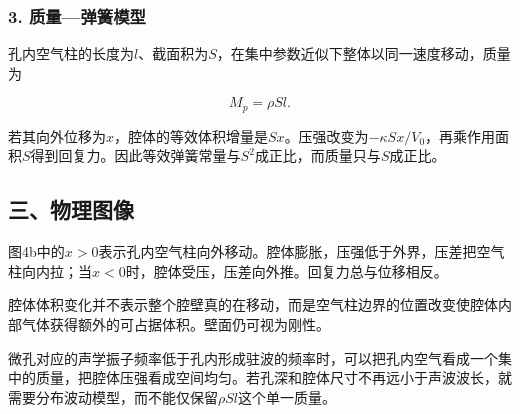 \documentclass[12pt,a4paper,fontset=fandol]{ctexart}
\begin{document}
\subsubsection{3.
质量---弹簧模型}\label{ux8d28ux91cfux5f39ux7c27ux6a21ux578b}

孔内空气柱的长度为\(l\)、截面积为\(S\)，在集中参数近似下整体以同一速度移动，质量为

\[
M_p=\rho Sl.
\]

若其向外位移为\(x\)，腔体的等效体积增量是\(Sx\)。压强改变为\(-\kappa Sx/V_0\)，再乘作用面积\(S\)得到回复力。因此等效弹簧常量与\(S^2\)成正比，而质量只与\(S\)成正比。

\subsection{三、物理图像}\label{ux4e09ux7269ux7406ux56feux50cf-3}

图4b中的\(x>0\)表示孔内空气柱向外移动。腔体膨胀，压强低于外界，压差把空气柱向内拉；当\(x<0\)时，腔体受压，压差向外推。回复力总与位移相反。

\begin{center}
\begin{minipage}{\linewidth}
\centering\begingroup{}
\ifdim\wd\diagrambox>.88\linewidth
\sbox{\diagrambox}{\resizebox{.88\linewidth}{!}{\usebox{\diagrambox}}}\fi
\ifdim\ht\diagrambox>.38\textheight
\resizebox{!}{.38\textheight}{\usebox{\diagrambox}}
\else\usebox{\diagrambox}\fi
\par{}\endgroup\end{minipage}\end{center}

腔体体积变化并不表示整个腔壁真的在移动，而是空气柱边界的位置改变使腔体内部气体获得额外的可占据体积。壁面仍可视为刚性。

微孔对应的声学振子频率低于孔内形成驻波的频率时，可以把孔内空气看成一个集中的质量，把腔体压强看成空间均匀。若孔深和腔体尺寸不再远小于声波波长，就需要分布波动模型，而不能仅保留\(\rho Sl\)这个单一质量。
\end{document}
